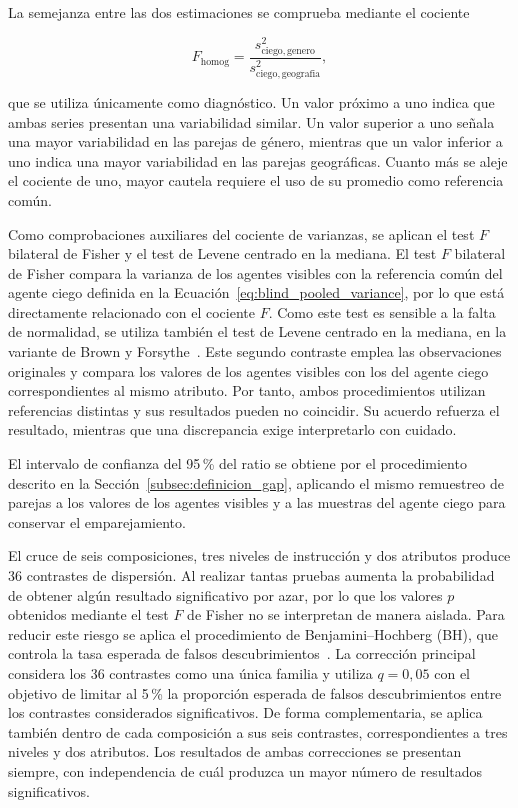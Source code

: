 La semejanza entre las dos estimaciones se comprueba mediante el cociente

\begin{equation}
	F_{\mathrm{homog}} =
	\frac{
		s^2_{\mathrm{ciego,genero}}
	}{
		s^2_{\mathrm{ciego,geografia}}
	},
	\label{eq:homogeneidad_ciego}
\end{equation}

que se utiliza únicamente como diagnóstico. Un valor próximo a uno indica que ambas series presentan una variabilidad similar. Un valor superior a uno señala una mayor variabilidad en las parejas de género, mientras que un valor inferior a uno indica una mayor variabilidad en las parejas geográficas. Cuanto más se aleje el cociente de uno, mayor cautela requiere el uso de su promedio como referencia común.

Como comprobaciones auxiliares del cociente de varianzas, se aplican el test $F$ bilateral de Fisher y el test de Levene centrado en la mediana. El test $F$ bilateral de Fisher compara la varianza de los agentes visibles con la referencia común del agente ciego definida en la Ecuación~\ref{eq:blind_pooled_variance}, por lo que está directamente relacionado con el cociente $F$. Como este test es sensible a la falta de normalidad, se utiliza también el test de Levene centrado en la mediana, en la variante de Brown y Forsythe~\cite{brown1974robust}. Este segundo contraste emplea las observaciones originales y compara los valores de los agentes visibles con los del agente ciego correspondientes al mismo atributo. Por tanto, ambos procedimientos utilizan referencias distintas y sus resultados pueden no coincidir. Su acuerdo refuerza el resultado, mientras que una discrepancia exige interpretarlo con cuidado.

El intervalo de confianza del 95\,\% del ratio se obtiene por el procedimiento descrito en la Sección~\ref{subsec:definicion_gap}, aplicando el mismo remuestreo de parejas a los valores de los agentes visibles y a las muestras del agente ciego para conservar el emparejamiento.

El cruce de seis composiciones, tres niveles de instrucción y dos atributos produce 36 contrastes de dispersión. Al realizar tantas pruebas aumenta la probabilidad de obtener algún resultado significativo por azar, por lo que los valores $p$ obtenidos mediante el test $F$ de Fisher no se interpretan de manera aislada. Para reducir este riesgo se aplica el procedimiento de Benjamini--Hochberg (BH), que controla la tasa esperada de falsos descubrimientos~\cite{benjamini1995controlling}. La corrección principal considera los 36 contrastes como una única familia y utiliza $q=0{,}05$ con el objetivo de limitar al 5\,\% la proporción esperada de falsos descubrimientos entre los contrastes considerados significativos. De forma complementaria, se aplica también dentro de cada composición a sus seis contrastes, correspondientes a tres niveles y dos atributos. Los resultados de ambas correcciones se presentan siempre, con independencia de cuál produzca un mayor número de resultados significativos.

